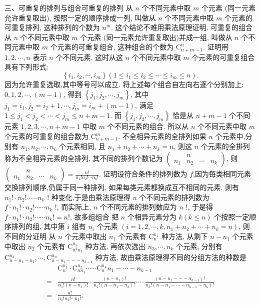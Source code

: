 三、可重复的排列与组合可重复的排列 从 $n$ 个不同元素中取 $m$ 个元素 (同一元素允许重复取出), 按照一定的顺序排成一列, 叫做从 $n$ 个不同元素中取 $m$ 个元素的可重复排列, 这种排列的个数为 $n^m$.
这个结论不难用乘法原理证明.
可重复的组合从 $n$ 个不同元素中取 $m$ 个元素 (同一元素允许重复取出)并成一组, 叫做从 $n$ 个不同元素中取 $m$ 个元素的可重复组合, 这种组合的个数为 $\mathrm{C}_{n+m-1}^n$.
证明用 $1,2, \cdots, n$ 表示 $n$ 个不同元素, 这时从这 $n$ 个不同元素中取 $m$ 个元素的可重复组合具有下列形式:
$$
\left\{i_1, i_2, \cdots, i_m\right\}\left(1 \leqslant i_1 \leqslant i_2 \leqslant \cdots \leqslant i_m \leqslant n\right) .
$$
因为允许重复选取,其中等号可以成立.
将上述每个组合自左向右逐个分别加上: $0,1,2, \cdots,(m-1)$, 得到 $\left\{j_1, j_2, \cdots, j_m\right\}$, 其中 $j_1=i_1, j_2=i_2+1, \cdots, j_m=i_m+(m-1)$, 满足 $1 \leqslant j_1<j_2<\cdots<j_m \leqslant n+m-1$. 而 $\left\{j_1, j_2, \cdots, j_m\right\}$ 恰是从 $n+m-1$ 个不同元素 $1,2,3, \cdots, n+m-1$ 中取 $m$ 个不同元素的组合.
所以从 $n$ 个不同元素中取 $m$ 个元素的可重复的组合数为 $\mathrm{C}_{n+m-1}^m$.
不全相异元素的全排列如果 $n$ 个元素中,分别有 $n_1, n_2, \cdots, n_k$ 个元素相同, 且 $n_1+n_2+\cdots+n_k=n$, 则这 $n$ 个元素的全排列称为不全相异元素的全排列, 其不同的排列个数记为 $\left(\begin{array}{cccc} & n & & \\ n_1 & n_2 & \cdots & n_k\end{array}\right)$, 则 $\left(\begin{array}{cccc} & n & \\ n_1 & n_2 & \cdots & n_k\end{array}\right)=\frac{n !}{n_{1} ! n_{2} ! \cdots n_{k} !}$.
证明设符合条件的排列数为 $f$,因为每类相同元素交换排列顺序,仍属于同一种排列, 如果每类元素都换成互不相同的元素, 则有 $n_{1} ! \cdot n_{2} ! \cdots \cdots n_k$ ! 种变化,于是由乘法原理得 $n$ 个不同元素的排列数为 $f \cdot n_{1} ! \cdot n_{2} ! \cdots \cdots n_k$ !, 而实际上, $n$ 个不同元素的排列数应为 $n$ !, 于是得 $f \cdot n_{1} ! \cdot n_{2} ! \cdots \cdots n_{k} !=n !$, 故多组组合 把 $n$ 个相异元素分为 $k(k \leqslant n)$ 个按照一定顺序排列的组, 其中第 $i$ 组有 $n_i$ 个元素 $\left(i=1,2, \cdots, k, n_1+n_2+\cdots+n_k=n\right)$, 则不同的分证明 从 $n$ 个元素中取出 $n_1$ 个元素有 $\mathrm{C}_n^{n_1}$ 种方法, 从剩下 $n-n_1$ 个元素中取出 $n_2$ 个元素有 $\mathrm{C}_{n^2 n_1}^{n_n}$ 种方法, 再依次选出 $n_3, \cdots, n_k$ 个元素, 分别有 $\mathrm{C}_{n-n_1-n_2}^{n_3}, \cdots, \mathrm{C}_{n-n_1-\cdots-n_{k-1}}^{n_n}$ 种方法, 故由乘法原理得不同的分组方法的种数是
$$
\begin{aligned}
& \mathrm{C}_n^{n_1} \cdot \mathrm{C}_{n n_1}^{n_2} \cdots \cdots \mathrm{C}_n^{n_k} n_1-\cdots-n_{k-1} \\
= & \frac{n !}{n_{1} !\left(n-n_1\right) !} \cdot \frac{\left(n-n_1\right) !}{n_{2} !\left(n-n_1-n_2\right) !} \cdots \cdot \frac{\left(n-n_1-\cdots-n_{k-1}\right) !}{n_{k} !\left(n-n_1-\cdots-n_{k-1}-n_k\right) !} \\
= & \frac{n !}{n_{1} ! n_{2} ! \cdots n_{k} !} .
\end{aligned}
$$
